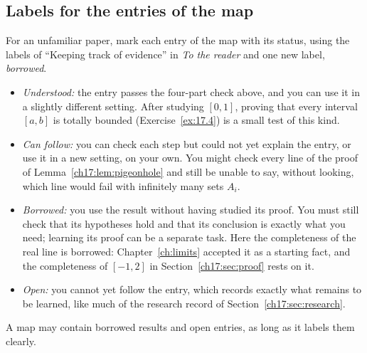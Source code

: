 \subsection*{Labels for the entries of the map}
For an unfamiliar paper, mark each entry of the map with its status, using the labels of ``Keeping track of evidence'' in \emph{To the reader} and one new label, \emph{borrowed}.
\begin{itemize}
\item \emph{Understood:} the entry passes the four-part check above, and you can use it in a slightly different setting. After studying $[0,1]$, proving that every interval $[a,b]$ is totally bounded (Exercise~\ref{ex:17.4}) is a small test of this kind.
\item \emph{Can follow:} you can check each step but could not yet explain the entry, or use it in a new setting, on your own. You might check every line of the proof of Lemma~\ref{ch17:lem:pigeonhole} and still be unable to say, without looking, which line would fail with infinitely many sets $A_i$.
\item \emph{Borrowed:} you use the result without having studied its proof. You must still check that its hypotheses hold and that its conclusion is exactly what you need; learning its proof can be a separate task. Here the completeness of the real line is borrowed: Chapter~\ref{ch:limits} accepted it as a starting fact, and the completeness of $[-1,2]$ in Section~\ref{ch17:sec:proof} rests on it.
\item \emph{Open:} you cannot yet follow the entry, which records exactly what remains to be learned, like much of the research record of Section~\ref{ch17:sec:research}.
\end{itemize}
A map may contain borrowed results and open entries, as long as it labels them clearly.
